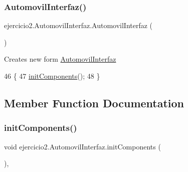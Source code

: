 \subsubsection{\texorpdfstring{Automovil\+Interfaz()}{AutomovilInterfaz()}}
{\footnotesize\ttfamily ejercicio2.\+Automovil\+Interfaz.\+Automovil\+Interfaz (\begin{DoxyParamCaption}{ }\end{DoxyParamCaption})\hspace{0.3cm}{\ttfamily [inline]}}

Creates new form \mbox{\hyperlink{classejercicio2_1_1_automovil_interfaz}{Automovil\+Interfaz}} 
\begin{DoxyCode}
46                                \{
47         \mbox{\hyperlink{classejercicio2_1_1_automovil_interfaz_a46fc96f0ec043a4e5c1d0fe2097e6d22}{initComponents}}();
48     \}
\end{DoxyCode}


\subsection{Member Function Documentation}
\mbox{\label{classejercicio2_1_1_automovil_interfaz_a46fc96f0ec043a4e5c1d0fe2097e6d22}} 
\subsubsection{\texorpdfstring{init\+Components()}{initComponents()}}
{\footnotesize\ttfamily void ejercicio2.\+Automovil\+Interfaz.\+init\+Components (\begin{DoxyParamCaption}{ }\end{DoxyParamCaption})\hspace{0.3cm}{\ttfamily [inline]}, {\ttfamily [private]}}

